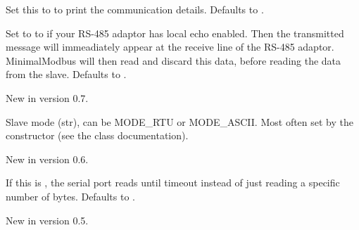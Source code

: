 \documentclass[letterpaper,10pt,english]{sphinxmanual}
\begin{document}
\begin{fulllineitems}
\begin{fulllineitems}
\end{fulllineitems}


\begin{fulllineitems}
\label{minimalmodbus:minimalmodbus.Instrument.debug}
Set this to  to print the communication details. Defaults to .

\end{fulllineitems}


\begin{fulllineitems}
\label{minimalmodbus:minimalmodbus.Instrument.handle_local_echo}
Set to to  if your RS-485 adaptor has local echo enabled.
Then the transmitted message will immeadiately appear at the receive line of the RS-485 adaptor.
MinimalModbus will then read and discard this data, before reading the data from the slave.
Defaults to .

New in version 0.7.

\end{fulllineitems}


\begin{fulllineitems}
\label{minimalmodbus:minimalmodbus.Instrument.mode}
Slave mode (str), can be MODE\_RTU or MODE\_ASCII.  Most often set by the constructor (see the class documentation).

New in version 0.6.

\end{fulllineitems}


\begin{fulllineitems}
\label{minimalmodbus:minimalmodbus.Instrument.precalculate_read_size}
If this is , the serial port reads until timeout
instead of just reading a specific number of bytes. Defaults to .

New in version 0.5.


\end{fulllineitems}
\end{fulllineitems}
\end{document}
